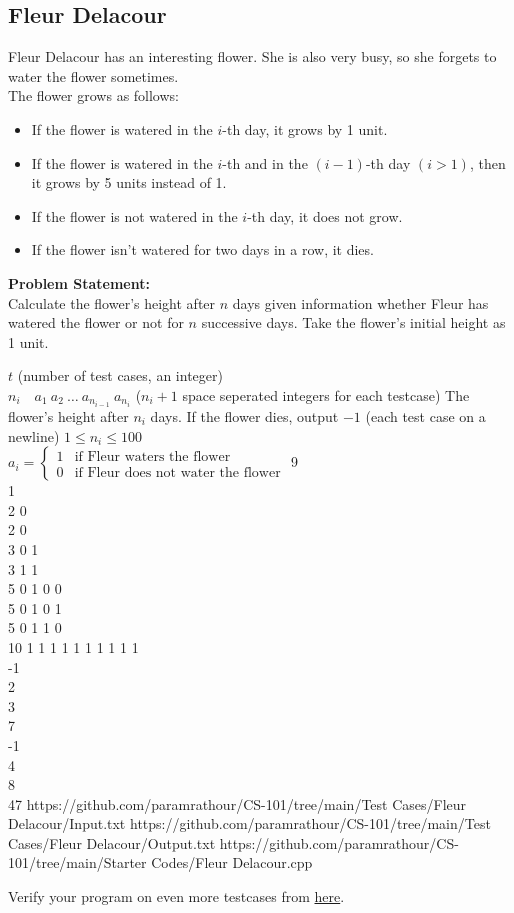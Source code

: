 \documentclass[../../Problems]{subfiles}
\begin{document}
\subsection{Fleur Delacour}
Fleur Delacour has an interesting flower. She is also very busy, so  she forgets to water the flower sometimes.\\
The flower grows as follows:
\begin{itemize}
\item If the flower is watered in the $i$-th day, it grows by 1 unit.
\item If the flower is watered in the $i$-th and in the $(i-1)$-th day $(i>1)$, then it grows by 5 units instead of 1.
\item If the flower is not watered in the $i$-th day, it does not grow.
\item If the flower isn't watered for two days in a row, it dies.
\end{itemize}
\textbf{Problem Statement:}\\
Calculate the flower's height after $n$ days given information whether Fleur has watered the flower or not for $n$ successive days. Take the flower's initial height as 1 unit.
\begin{testcasesMore}
	{$t$ \hfill(number of test cases, an integer)\\
	$n_i\quad a_{1}\ a_{2}\ \ldots\ a_{n_{i-1}}\ a_{n_i}$ \hfill($n_i+1$ space seperated integers for each testcase)}
	{The flower's height after $n_i$ days. If the flower dies, output $-1$ \hfill(each test case on a newline)}
	{$1 \leq n_i \leq 100$\\[0.5em]
	$
	a_i = \begin{cases} 
      1 & \text{if Fleur waters the flower}\\
      0 & \text{if Fleur does not water the flower}
   \end{cases}
	$}
	{9\\1\\2 0\\2 0\\3 0 1\\3 1 1\\5 0 1 0 0\\5 0 1 0 1\\5 0 1 1 0\\10 1 1 1 1 1 1 1 1 1}
	{1\\-1\\2\\3\\7\\-1\\4\\8\\47}
	{https://github.com/paramrathour/CS-101/tree/main/Test Cases/Fleur Delacour/Input.txt}
	{https://github.com/paramrathour/CS-101/tree/main/Test Cases/Fleur Delacour/Output.txt}
	{https://github.com/paramrathour/CS-101/tree/main/Starter Codes/Fleur Delacour.cpp}
\end{testcasesMore}
\begin{note}
	Verify your program on even more testcases from \href{https://codeforces.com/problemset/problem/1585/A}{here}.
\end{note}
\end{document}
